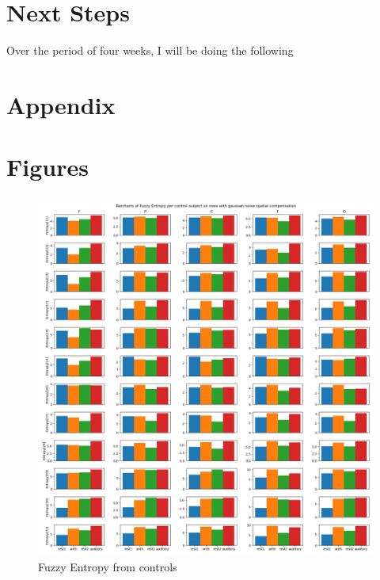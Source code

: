 \documentclass[10pt]{article}
\begin{document}
\section{Next Steps}
Over the period of four weeks, I will be doing the following

\section{Appendix}\label{sec:appendix}

\section{Figures}\label{sec:figures}
\begin{figure}[H]
  \includegraphics[width=16cm]{../../../data_analysis_results/FuzzEnt/Control/all-fuzzyEntr.png}
  \caption{Fuzzy Entropy from controls}
  \label{fig:controlFuzzEnt}
\end{figure}
\end{document}

